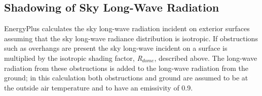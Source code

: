 \subsection{Shadowing of Sky Long-Wave Radiation}\label{shadowing-of-sky-long-wave-radiation}

EnergyPlus calculates the sky long-wave radiation incident on exterior surfaces assuming that the sky long-wave radiance distribution is isotropic. If obstructions such as overhangs are present the sky long-wave incident on a surface is multiplied by the isotropic shading factor, \emph{R\(_{dome}\)}, described above. The long-wave radiation from these obstructions is added to the long-wave radiation from the ground; in this calculation both obstructions and ground are assumed to be at the outside air temperature and to have an emissivity of 0.9.
